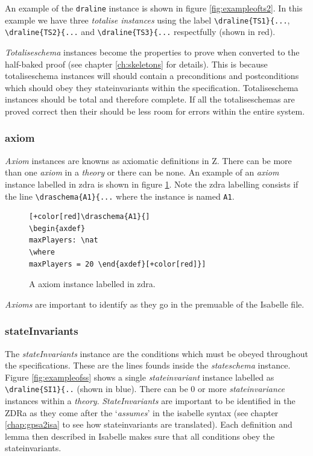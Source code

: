 An example of the \verb|draline| instance is shown in figure \ref{fig:exampleofts2}. In this example we have three \emph{totalise instances}
using the label \verb|\draline{TS1}{...|, \verb|\draline{TS2}{...| and
\verb|\draline{TS3}{...| respectfully (shown in red).

\emph{Totaliseschema} instances become the properties to prove when converted to the
half-baked proof (see chapter \ref{ch:skeletons} for details). This is because
totaliseschema instances will should contain a preconditions and postconditions
which should obey they stateinvariants within the specification. Totaliseschema
instances should be total and therefore complete. If all the totaliseschemas are
proved correct then their should be less room for errors within the entire
system.

\subsubsection{axiom}

\emph{Axiom} instances are knowns as axiomatic definitions in Z. There can be
more than one \emph{axiom} in a \emph{theory} or there can be none. An example
of an \emph{axiom} instance labelled in \gls{zdra} is shown in figure
\ref{fig:exampleofa}. Note the \gls{zdra} labelling consists if the line
\verb|\draschema{A1}{...| where the instance is named \verb|A1|.

\begin{figure}[H]
\centering
\begin{footnotesize}
\begin{BVerbatim}[commandchars=+\[\]]
[+color[red]\draschema{A1}{]
\begin{axdef}
maxPlayers: \nat
\where
maxPlayers = 20 \end{axdef}[+color[red]}]
\end{BVerbatim}
\end{footnotesize}
\caption{\label{fig:exampleofa} A axiom instance labelled in \gls{zdra}.}
\end{figure}

\emph{Axioms} are important to identify as they go in the premuable of the
Isabelle file.

\subsubsection{stateInvariants}
The \emph{stateInvariants} instance are the conditions which must be obeyed
throughout the specifications. These are the lines founds inside the
\emph{stateschema} instance. Figure \ref{fig:exampleofss} shows a single
\emph{stateinvariant} instance labelled as \verb|\draline{SI1}{..| (shown in
blue). There can be 0 or more \emph{stateinvariance} instances within a
\emph{theory}. \emph{StateInvariants} are important to be identified in the ZDRa
as they come after the `\emph{assumes}' in the isabelle syntax (see chapter
\ref{chap:gpsa2isa} to see how stateinvariants are translated). Each definition
and lemma then described in Isabelle makes sure that all conditions obey the stateinvariants.


